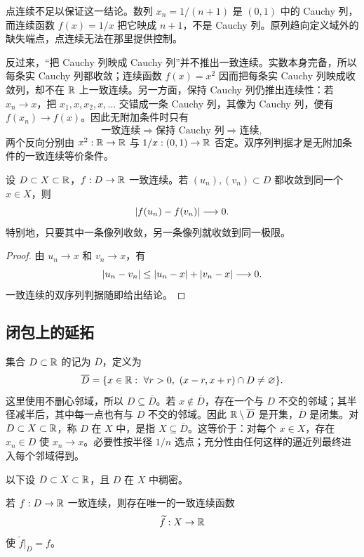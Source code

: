 点连续不足以保证这一结论。数列 \(x_n=1/(n+1)\) 是 \((0,1)\) 中的 Cauchy 列，而连续函数 \(f(x)=1/x\) 把它映成 \(n+1\)，不是 Cauchy 列。原列趋向定义域外的缺失端点，点连续无法在那里提供控制。

反过来，“把 Cauchy 列映成 Cauchy 列”并不推出一致连续。实数本身完备，所以每条实 Cauchy 列都收敛；连续函数 \(f(x)=x^2\) 因而把每条实 Cauchy 列映成收敛列，却不在 \(\mathbb{R}\) 上一致连续。另一方面，保持 Cauchy 列仍推出连续性：若 \(x_n\to x\)，把 \(x_1,x,x_2,x,\ldots\) 交错成一条 Cauchy 列，其像为 Cauchy 列，便有 \(f(x_n)\to f(x)\)。因此无附加条件时只有
\[
 \text{一致连续}\Longrightarrow
 \text{保持 Cauchy 列}\Longrightarrow
 \text{连续},
\]
两个反向分别由 \(x^2:\mathbb{R}\to\mathbb{R}\) 与 \(1/x:(0,1)\to\mathbb{R}\) 否定。双序列判据才是无附加条件的一致连续等价条件。

\begin{proposition}[逼近列的相容性]
设 \(D\subset X\subset\mathbb{R}\)，\(f:D\to\mathbb{R}\) 一致连续。若 \((u_n),(v_n)\subset D\) 都收敛到同一个 \(x\in X\)，则
\[
 \left|f(u_n)-f(v_n)\right|\longrightarrow0.
\]
特别地，只要其中一条像列收敛，另一条像列就收敛到同一极限。
\end{proposition}

\begin{proof}
由 \(u_n\to x\) 和 \(v_n\to x\)，有
\[
 \left|u_n-v_n\right|\le\left|u_n-x\right|+\left|v_n-x\right|\longrightarrow0.
\]
一致连续的双序列判据随即给出结论。
\end{proof}

\subsection{闭包上的延拓}


集合 \(D\subset\mathbb{R}\) 的记为 \(\overline D\)，定义为
\[
 \overline D=\{x\in\R:\ \forall r>0,\ (x-r,x+r)\cap D\ne\varnothing\}.
\]
这里使用不删心邻域，所以 \(D\subseteq\overline D\)。若 \(x\notin\overline D\)，存在一个与 \(D\) 不交的邻域；其半径减半后，其中每一点也有与 \(D\) 不交的邻域。因此 \(\mathbb{R}\setminus\overline D\) 是开集，\(\overline D\) 是闭集。对 \(D\subset X\subset\mathbb{R}\)，称 \(D\) 在 \(X\) 中，是指 \(X\subseteq\overline D\)。这等价于：对每个 \(x\in X\)，存在 \(x_n\in D\) 使 \(x_n\to x\)。必要性按半径 \(1/n\) 选点；充分性由任何这样的逼近列最终进入每个邻域得到。

以下设 \(D\subset X\subset\mathbb{R}\)，且 \(D\) 在 \(X\) 中稠密。

\begin{theorem}[稠密集上的一致连续延拓]
若 \(f:D\to\mathbb{R}\) 一致连续，则存在唯一的一致连续函数
\[
 \widetilde f:X\to\mathbb{R}
\]
使 \(\widetilde f|_D=f\)。
\end{theorem}

